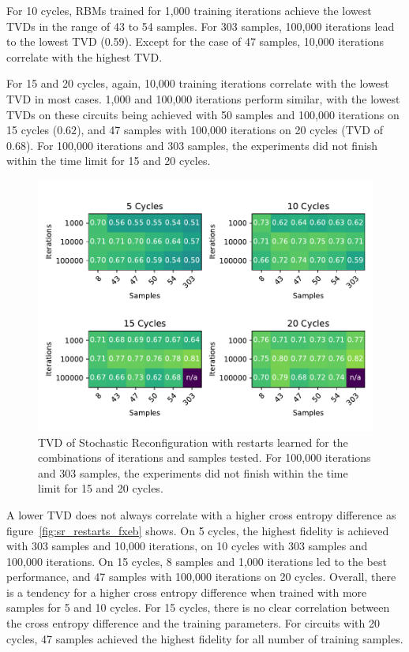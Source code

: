 For 10 cycles, RBMs trained for 1,000 training iterations achieve the lowest TVDs in the range of 43 to 
54 samples. For 303 samples, 100,000 iterations lead to the lowest TVD (0.59). Except for the 
case of 47 samples, 10,000 iterations correlate with the highest TVD.

For 15 and 20 cycles, again, 10,000 training iterations correlate with the lowest TVD in most cases. 1,000
and 100,000 iterations perform similar, with the lowest TVDs on these circuits being achieved with 50 samples and 
100,000 iterations on 15 cycles ($0.62$), and 47 samples with 100,000 iterations on 20 cycles (TVD of $0.68$).
For 100,000 iterations and 303 samples, the experiments did not finish within the time limit for 15 and 20 cycles.

\begin{figure}[H]
  \centering
  \includegraphics[width=\textwidth]{figures/results/SR-restarts-learned/tvd_heatmap.pdf}
  \caption[TVD of Stochastic Reconfiguration with restarts learned]{TVD of Stochastic 
  Reconfiguration with restarts learned for the combinations of iterations and samples tested.
  For 100,000 iterations and 303 samples, the experiments did not finish within the time limit for 15 and 20 cycles.}
  \label{fig:sr_restarts_tvd}
\end{figure}

A lower TVD does not always correlate with a higher cross entropy difference as figure~\ref{fig:sr_restarts_fxeb}
shows. On 5 cycles, the highest fidelity is achieved with 303 samples and 10,000 iterations, on 10 cycles 
with 303 samples and 100,000 iterations. On 15 cycles, 8 samples and 1,000 iterations led to the best performance, 
and 47 samples with 100,000 iterations on 20 cycles. Overall, there is a tendency for a higher cross entropy difference 
when trained with more samples for 5 and 10 cycles. For 15 cycles, there is no clear correlation between the 
cross entropy difference and the training parameters. For circuits with 20 cycles, 47 samples achieved the highest 
fidelity for all number of training samples.

